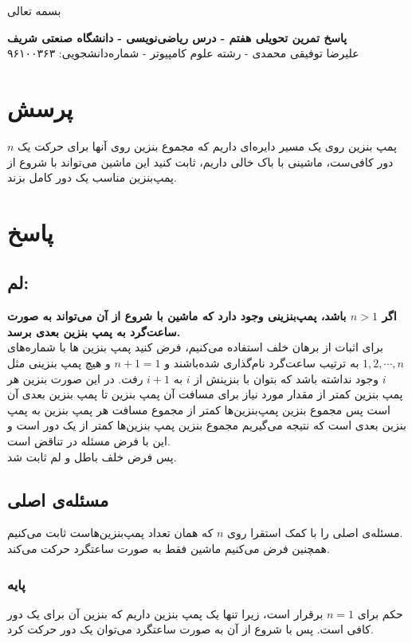 \documentclass[12pt,a4paper]{article}
\begin{document}
\begin{center}
	بسمه تعالی
\end{center}
\begin{center}
	\textbf{پاسخ تمرین تحویلی هفتم - درس ریاضی‌نویسی - دانشگاه صنعتی شریف}
	\\
	علیرضا توفیقی محمدی - رشته علوم کامپیوتر - شماره‌دانشجویی: ۹۶۱۰۰۳۶۳
\end{center}
\section*{پرسش}
$n$ 
پمپ بنزین روی یک مسیر دایره‌ای داریم که مجموع بنزین روی آنها برای حرکت یک دور کافی‌ست، ماشینی با باک خالی داریم، ثابت کنید این ماشین می‌تواند با شروع از پمپ‌بنزین مناسب یک دور کامل بزند.
\section*{پاسخ}
\subsection*{لم:}
\textbf{اگر 
$n > 1$
باشد، پمپ‌بنزینی وجود دارد که ماشین با شروع از آن می‌تواند به صورت ساعت‌گرد به پمپ بنزین بعدی برسد.}
\\
برای اثبات از برهان خلف استفاده می‌کنیم، فرض کنید پمپ بنزین ها با شماره‌های 
$1, 2, \cdots, n$
به ترتیب ساعت‌گرد نام‌گذاری شده‌باشند و $n+1 = 1$ و هیچ پمپ بنزینی مثل $i$ وجود نداشته باشد که بتوان با بنزینش از $i$ به $i+1$ رفت.
در این صورت بنزین هر پمپ بنزین کمتر از مقدار مورد نیاز برای مسافت آن پمپ بنزین تا پمپ بنزین بعدی آن است پس مجموع بنزین پمپ‌بنزین‌ها کمتر از مجموع مسافت هر پمپ بنزین به پمپ بنزین بعدی است که نتیجه می‌گیریم مجموع بنزین پمپ بنزین‌ها کمتر از یک دور است و این با فرض مسئله در تناقض است.\\
پس فرض خلف باطل و لم ثابت شد.
\subsection*{مسئله‌ی اصلی}
مسئله‌ی اصلی را با کمک استقرا روی $n$ که همان تعداد پمپ‌بنزین‌هاست ثابت می‌کنیم.
\\
همچنین فرض می‌کنیم ماشین فقط به صورت ساعتگرد حرکت می‌کند.
\\
\subsubsection*{پایه}
حکم برای $n=1$ برقرار است، زیرا تنها یک پمپ بنزین داریم که بنزین آن برای یک دور کافی است. پس با شروع از آن به صورت ساعتگرد می‌توان یک دور حرکت کرد.
\end{document}
